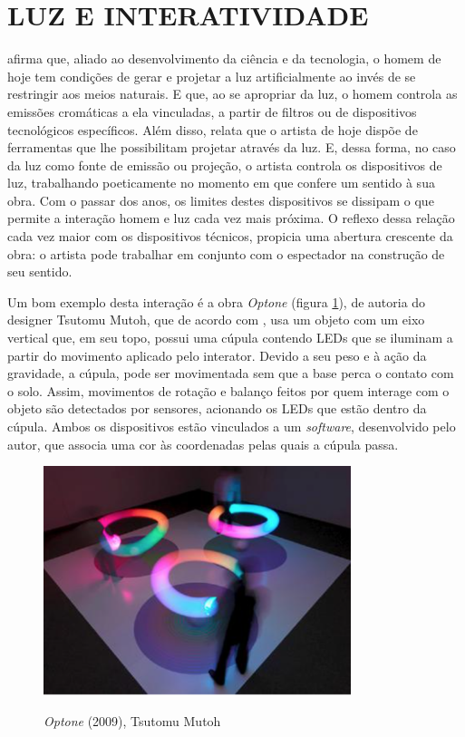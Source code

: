 \section{LUZ E INTERATIVIDADE}

 afirma que, aliado ao desenvolvimento da ciência e da tecnologia, o homem de hoje tem condições de gerar e projetar a luz artificialmente ao invés de se restringir aos meios naturais. E que, ao se apropriar da luz, o homem controla as emissões cromáticas a ela vinculadas, a partir de filtros ou de dispositivos tecnológicos específicos. Além disso, relata que o artista de hoje dispõe de ferramentas que lhe possibilitam projetar através da luz. E, dessa forma, no caso da luz como fonte de emissão ou projeção, o artista controla os dispositivos de luz, trabalhando poeticamente no momento em que confere um sentido à sua obra. Com o passar dos anos, os limites destes dispositivos se dissipam o que permite a interação homem e luz cada vez mais próxima. O reflexo dessa relação cada vez maior com os dispositivos técnicos, propicia uma abertura crescente da obra: o artista pode trabalhar em conjunto com o espectador na construção de seu sentido.


Um bom exemplo desta interação é a obra \textit{Optone} (figura \ref{fig:tsutomu_mutoh}), de autoria do designer Tsutomu Mutoh, que de acordo com , usa um objeto com um eixo vertical que, em seu topo, possui uma cúpula contendo LEDs que se iluminam a partir do movimento aplicado pelo interator. Devido a seu peso e à ação da gravidade, a cúpula, pode ser movimentada sem que a base perca o contato com o solo. Assim, movimentos de rotação e balanço feitos por quem interage com o objeto são detectados por sensores, acionando os LEDs que estão dentro da cúpula. Ambos os dispositivos estão vinculados a um \textit{software}, desenvolvido pelo autor, que associa uma cor às coordenadas pelas quais a cúpula passa.

\begin{figure}[H]
    \centering
    \caption{\textit{Optone} (2009), Tsutomu Mutoh}
	\vspace*{0,2cm}
    \includegraphics[width=0.8\textwidth]{./04-figuras/tsutomu_mutoh}
    \label{fig:tsutomu_mutoh}
\end{figure}
\vspace*{-0,9cm}
{\raggedright {}}\\

